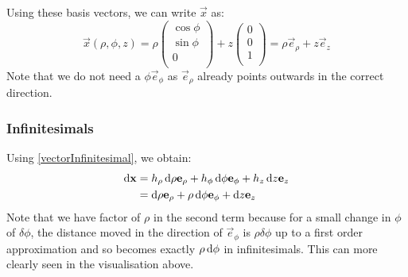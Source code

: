 \documentclass[../main.tex]{subfiles}
\begin{document}
Using these basis vectors, we can write $\vec{x}$ as:
\[
  \vec{x}(\rho, \phi, z) = \rho \begin{pmatrix}
  \cos \phi \\
  \sin \phi \\
  0 \\
  \end{pmatrix} + z \begin{pmatrix}
  0 \\
  0 \\
  1 \\
  \end{pmatrix} = \rho \vec{e}_\rho + z\vec{e}_z
\]
Note that we do not need a $\phi \vec{e}_\phi$ as $\vec{e}_\rho$ already points outwards in the correct direction.
\subsubsection{Infinitesimals}
\label{cylindricalInfinitesimals}
Using \cref{vectorInfinitesimal}, we obtain:
\begin{align*}
  \d{\vec{x}} &= h_\rho \d{\rho} \vec{e}_\rho + h_\phi \d{\phi} \vec{e}_\phi + h_z \d{z} \vec{e}_z \\
              &= \d{\rho} \vec{e}_\rho + \rho \d{\phi} \vec{e}_\phi + \d{z}\vec{e}_z
\end{align*}
Note that we have factor of $\rho$ in the second term because for a small change in $\phi$ of $\delta \phi$, the distance moved in the direction of $\vec{e}_\phi$ is $\rho \delta \phi$ up to a first order approximation and so becomes exactly $\rho \d{\phi}$ in infinitesimals.
This can more clearly seen in the visualisation above.
\end{document}
